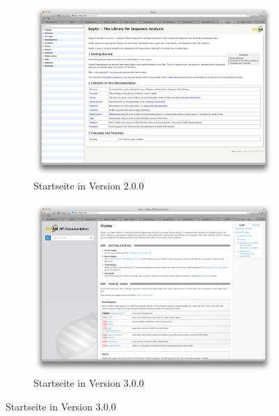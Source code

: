 \thispagestyle{empty}
\begin{landscape}
\begin{figure}
        \centering
        \begin{subfigure}[b]{0.38\linewidth}
                \includegraphics[width=\linewidth]{Figures/dox/dox-2_0_0-large-home.png}
                \caption{Startseite in Version 2.0.0}
                \label{fig:dox-large-home-2.0.0}
        \end{subfigure}
        \hspace{1cm}
        \begin{subfigure}[b]{0.38\linewidth}
                \includegraphics[width=\linewidth]{Figures/dox/dox-3_0_0-large-home.png}
                \caption{Startseite in Version 3.0.0}

\end{subfigure}
\end{figure}
\end{landscape}

